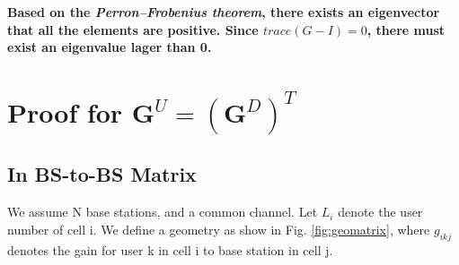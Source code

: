 \documentclass[12pt]{article}
\begin{document}
\textbf{Based on the \textit{Perron–Frobenius theorem}, there exists an eigenvector that all the elements are positive. Since $trace(G-I)=0$, there must exist an eigenvalue lager than 0.}

\section{Proof for $\bm{G}^U = (\bm{G}^D)^T$}

\subsection{In BS-to-BS Matrix}
We assume N base stations, and a common channel. Let $L_i$ denote the user number of cell i. We define a geometry as show in Fig. \ref{fig:geomatrix}, where $g_{ikj}$ denotes the gain for user k in cell i to base station in cell j.%
%
\end{document}
